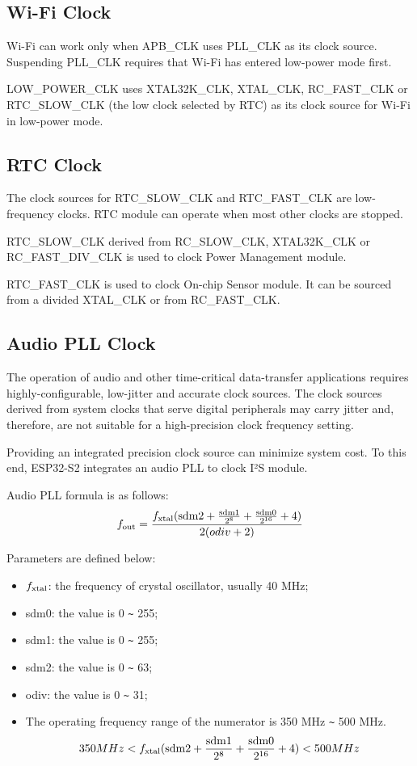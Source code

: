 \documentclass[main\_\_EN.tex]{subfiles}
\begin{document}
\subsection{Wi-Fi Clock}
Wi-Fi can work only when APB\_CLK uses PLL\_CLK as its clock source. Suspending PLL\_CLK requires that Wi-Fi has entered low-power mode first.

LOW\_POWER\_CLK uses XTAL32K\_CLK, XTAL\_CLK, RC\_FAST\_CLK or RTC\_SLOW\_CLK (the low clock selected by RTC) as its clock source for Wi-Fi in low-power mode.


\subsection{RTC Clock}

The clock sources for \hypertarget{SLOW_CLK}{RTC\_SLOW\_CLK} and RTC\_FAST\_CLK are low-frequency clocks. RTC module can operate when most other clocks are stopped.


RTC\_SLOW\_CLK derived from RC\_SLOW\_CLK, XTAL32K\_CLK or RC\_FAST\_DIV\_CLK is used to clock Power Management module.

RTC\_FAST\_CLK is used to clock On-chip Sensor module. It can be sourced from a divided XTAL\_CLK or from RC\_FAST\_CLK.

\subsection{Audio PLL Clock}\label{audiopll}
The operation of audio and other time-critical data-transfer applications requires highly-configurable, low-jitter and accurate clock sources. The clock sources derived from system clocks that serve digital peripherals may carry jitter and, therefore, are not suitable for a high-precision clock frequency setting.

Providing an integrated precision clock source can minimize system cost. To this end, ESP32-S2 integrates an audio PLL to clock I²S module.

Audio PLL formula is as follows:
$$f_{\rm{out}} = \frac{f_{\rm{xtal}}(\rm{sdm2}+\frac{\rm{sdm1}}{2^8}+\frac{\rm{sdm0}}{2^{16}}+4)}{2(odiv+2)}$$

Parameters are defined below:
\begin{itemize}
    \item \begin{math}f_{\rm{xtal}}\end{math}: the frequency of crystal oscillator, usually 40 MHz;
    \item sdm0: the value is 0 \verb+~+ 255;
    \item sdm1: the value is 0 \verb+~+ 255;
    \item sdm2: the value is 0 \verb+~+ 63;
    \item odiv: the value is 0 \verb+~+ 31;
    \item The operating frequency range of the numerator is 350 MHz \verb+~+ 500 MHz.
$$ 350 MHz<{f_{\rm{xtal}}(\rm{sdm2}+\frac{\rm{sdm1}}{2^8}+\frac{\rm{sdm0}}{2^{16}}+4)}<500 MHz $$
\end{itemize}
\end{document}
